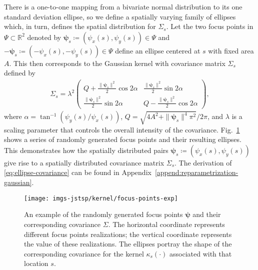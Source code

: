 \documentclass[journal]{IEEEtran}
\begin{document}
There is a one-to-one mapping from a bivariate normal distribution to its one standard
deviation ellipse, so we define a spatially varying family of ellipses which, in turn, defines the spatial distribution for $\Sigma_s$. 
Let the two focus points in $\Psi \subset \mathbb{R}^2$ denoted by $\boldsymbol \psi_s \coloneqq (\psi_x(s), \psi_y(s)) \in \Psi$ and $- \boldsymbol \psi_s \coloneqq (-\psi_x(s), -\psi_y(s)) \in \Psi$ define an ellipse centered at $s$ with fixed area $A$. 
This then corresponds to the Gaussian kernel with covariance matrix $\Sigma_s$ defined by 
\begin{equation}
\begin{aligned}
    \Sigma_s = \lambda^2 
    \begin{pmatrix} 
    Q + \frac{\|\boldsymbol\psi_s\|^2}{2}\cos{2\alpha} & {\frac{\|\boldsymbol\psi_s\|^2}{2}\sin{2\alpha}} \\
    {\frac{\|\boldsymbol\psi_s\|^2}{2}\sin{2\alpha}} & Q - \frac{\|\boldsymbol\psi_s\|^2}{2}\cos{2\alpha}
    \end{pmatrix},
    \label{eq:ellipse-covariance}
\end{aligned}
\end{equation}
where $\alpha = \tan^{-1}(\psi_y(s)/\psi_x(s))$, $Q = \sqrt{4A^2 + \|\boldsymbol\psi_s\|^4\pi^2}/2\pi$, and $\lambda$ is a scaling parameter that controls the overall intensity of the covariance. 
Fig.~\ref{fig:focus-points-exp} shows a series of randomly generated focus points and their resulting ellipses. 
This demonstrates how the spatially distributed pairs $\boldsymbol{\psi}_s \coloneqq (\psi_x(s), \psi_y(s))$ give rise to a spatially distributed covariance matrix $\Sigma_s$.
The derivation of \eqref{eq:ellipse-covariance} can be found in Appendix~\ref{append:reparametrization-gaussian}.

\begin{figure}[!t]
\centering
\texttt{[image: imgs-jstsp/kernel/focus-points-exp]}
\caption{An example of the randomly generated focus points $\boldsymbol{\psi}$ and their corresponding covariance $\Sigma$. The horizontal coordinate represents different focus points realizations; the vertical coordinate represents the value of these realizations. The ellipses portray the shape of the corresponding covariance for the kernel $\kappa_s(\cdot)$ associated with that location $s$.}
\label{fig:focus-points-exp}
\end{figure}
\end{document}
